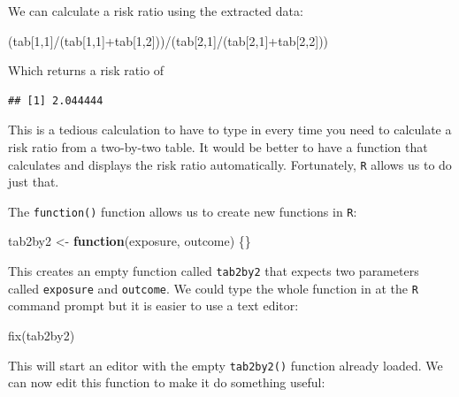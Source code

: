 \documentclass[
  12pt,
]{book}
\newenvironment{Shaded}{\begin{snugshade}}{\end{snugshade}}
\newcommand{\ControlFlowTok}[1]{\textcolor[rgb]{0.13,0.29,0.53}{\textbf{#1}}}
\newcommand{\DecValTok}[1]{\textcolor[rgb]{0.00,0.00,0.81}{#1}}
\newcommand{\FunctionTok}[1]{\textcolor[rgb]{0.00,0.00,0.00}{#1}}
\newcommand{\NormalTok}[1]{#1}
\newcommand{\OtherTok}[1]{\textcolor[rgb]{0.56,0.35,0.01}{#1}}
\newcommand{\SpecialCharTok}[1]{\textcolor[rgb]{0.00,0.00,0.00}{#1}}
\begin{document}
We can calculate a risk ratio using the extracted data:

\begin{Shaded}
\begin{Highlighting}[]
\NormalTok{(tab[}\DecValTok{1}\NormalTok{,}\DecValTok{1}\NormalTok{]}\SpecialCharTok{/}\NormalTok{(tab[}\DecValTok{1}\NormalTok{,}\DecValTok{1}\NormalTok{]}\SpecialCharTok{+}\NormalTok{tab[}\DecValTok{1}\NormalTok{,}\DecValTok{2}\NormalTok{]))}\SpecialCharTok{/}\NormalTok{(tab[}\DecValTok{2}\NormalTok{,}\DecValTok{1}\NormalTok{]}\SpecialCharTok{/}\NormalTok{(tab[}\DecValTok{2}\NormalTok{,}\DecValTok{1}\NormalTok{]}\SpecialCharTok{+}\NormalTok{tab[}\DecValTok{2}\NormalTok{,}\DecValTok{2}\NormalTok{]))}
\end{Highlighting}
\end{Shaded}

Which returns a risk ratio of

\begin{verbatim}
## [1] 2.044444
\end{verbatim}

This is a tedious calculation to have to type in every time you need to calculate a risk ratio from a two-by-two table. It would be better to have a function that calculates and displays the risk ratio automatically. Fortunately, \texttt{R} allows us to do just that.

The \texttt{function()} function allows us to create new functions in \texttt{R}:

\begin{Shaded}
\begin{Highlighting}[]
\NormalTok{tab2by2 }\OtherTok{\textless{}{-}} \ControlFlowTok{function}\NormalTok{(exposure, outcome) \{\}}
\end{Highlighting}
\end{Shaded}

This creates an empty function called \texttt{tab2by2} that expects two parameters called \texttt{exposure} and \texttt{outcome}. We could type the whole function in at the \texttt{R} command prompt but it is easier to use a text editor:

\begin{Shaded}
\begin{Highlighting}[]
\FunctionTok{fix}\NormalTok{(tab2by2)}
\end{Highlighting}
\end{Shaded}

This will start an editor with the empty \texttt{tab2by2()} function already loaded. We can now edit this function to make it do something useful:
\end{document}
